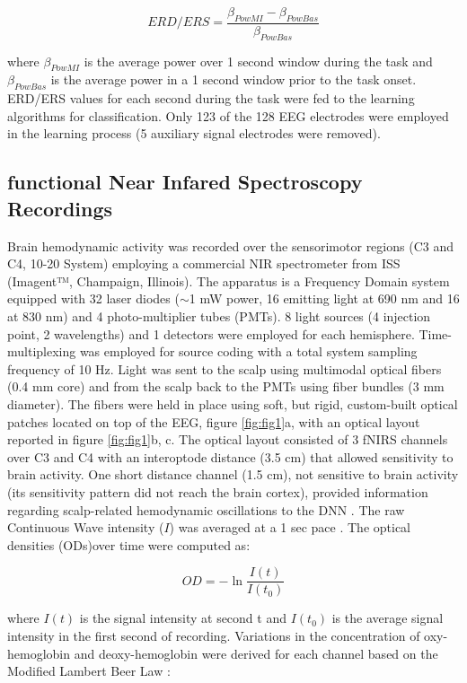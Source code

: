 \documentclass[12pt ]{iopart}
\begin{document}
\begin{equation}
\label{eqn:erders}
ERD/ERS=\frac{\beta_{PowMI}-\beta_{PowBas}}{\beta_{PowBas}}
\end{equation} 

where $\beta_{PowMI}$ is the average power over 1 second window during the task and $\beta_{PowBas}$ is the average power in a 1 second window prior to the task onset.
ERD/ERS values for each second during the task were fed to the learning algorithms for classification. Only 123 of the 128 EEG electrodes were employed in the learning process (5 auxiliary signal electrodes were removed).

\subsection{functional Near Infared Spectroscopy Recordings}
Brain hemodynamic activity was recorded over the sensorimotor regions (C3 and C4, 10-20 System) employing a commercial NIR spectrometer from ISS (Imagent™, Champaign, Illinois).
The apparatus is a Frequency Domain system equipped with 32 laser diodes ($\sim$1 mW  power, 16 emitting light at 690 nm and 16 at 830 nm) and 4 photo-multiplier tubes (PMTs). 
8 light sources (4 injection point, 2 wavelengths) and 1 detectors were employed for each hemisphere. Time-multiplexing was employed for source coding with a total system sampling frequency of 10 Hz.  Light was sent to the scalp using multimodal optical fibers (0.4 mm core) and from the scalp back to the PMTs using fiber bundles (3 mm diameter).  The fibers were held in place using soft, but rigid, custom-built optical patches located on top of the EEG, figure \ref{fig:fig1}a, with an optical layout reported in figure \ref{fig:fig1}b, c. The optical layout consisted of 3 fNIRS channels over C3 and C4 with an interoptode distance (3.5 cm) that allowed sensitivity to brain activity. One short distance channel (1.5 cm),  not sensitive to brain activity (its sensitivity pattern did not reach the brain cortex), provided information regarding scalp-related hemodynamic oscillations to the DNN \parencite{gagnon2014further}.  
The raw Continuous Wave intensity ($I$)  was averaged  at a 1 sec pace .
The optical densities (ODs)over time were computed as:

\begin{equation}
\label{eqn:erders}
OD=-\ln\frac{I(t)}{I(t_{0})}
\end{equation} 

where $I(t)$ is the signal intensity at second t and $I(t_{0})$ is the average signal intensity in the first second of recording.
Variations in the concentration of oxy-hemoglobin and deoxy-hemoglobin were derived for each channel  based on the Modified Lambert Beer Law \parencite{sassaroli2004comment}:
\end{document}
